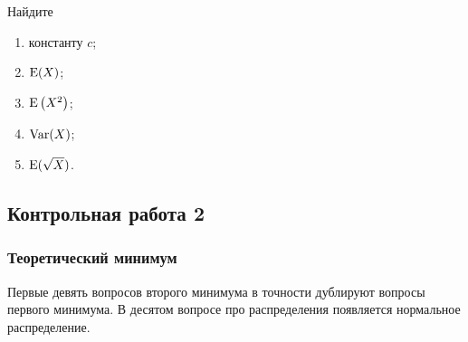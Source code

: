 \begin{enumerate}
Найдите
\begin{enumerate}
	\item константу $c$;
	\item $\operatorname{E}(X)$;
	\item $\operatorname{E}\left(X^2\right)$;
	\item $\operatorname{Var}(X)$;
	\item $\operatorname{E}(\sqrt{X})$.
\end{enumerate}



\end{enumerate}

\newpage
\subsection{Контрольная работа 2}
\label{sec:minimum_kr_02}

\subsubsection*{Теоретический минимум}

Первые девять вопросов второго минимума в точности дублируют вопросы 
первого минимума. 
В десятом вопросе про распределения появляется нормальное распределение. 

